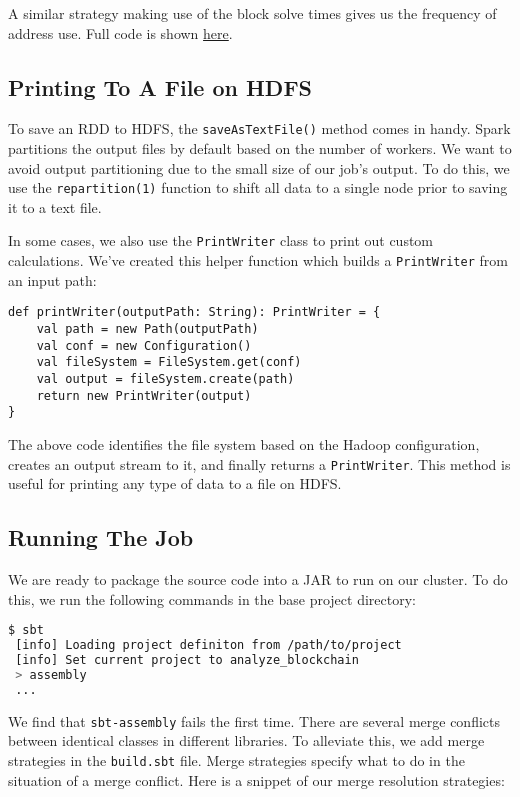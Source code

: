 \documentclass[9pt,twocolumn,twoside]{idsi}
\begin{document}
A similar strategy making use of the block solve times gives us the frequency of address use. Full code is shown \href{https://github.com/nishilshah17/idsi_bitcoin/blob/master/analyze_blockchain/src/main/scala/AddressReuse.scala}{here}.

\subsection{Printing To A File on HDFS}

To save an RDD to HDFS, the \lstinline{saveAsTextFile()} method comes in handy. Spark partitions the output files by default based on the number of workers. We want to avoid output partitioning due to the small size of our job's output. To do this, we use the \lstinline{repartition(1)} function to shift all data to a single node prior to saving it to a text file.

In some cases, we also use the \lstinline{PrintWriter} class to print out custom calculations. We've created this helper function which builds a \lstinline{PrintWriter} from an input path:

\begin{lstlisting}
def printWriter(outputPath: String): PrintWriter = {
    val path = new Path(outputPath)
    val conf = new Configuration()
    val fileSystem = FileSystem.get(conf)
    val output = fileSystem.create(path)
    return new PrintWriter(output)
}
\end{lstlisting}

The above code identifies the file system based on the Hadoop configuration, creates an output stream to it, and finally returns a \lstinline{PrintWriter}. This method is useful for printing any type of data to a file on HDFS.

\subsection{Running The Job}
We are ready to package the source code into a JAR to run on our cluster. To do this, we run the following commands in the base project directory:

\begin{lstlisting}[language=bash]
 $ sbt
 [info] Loading project definiton from /path/to/project
 [info] Set current project to analyze_blockchain
 > assembly
 ...
\end{lstlisting}

We find that \lstinline{sbt-assembly} fails the first time. There are several merge conflicts between identical classes in different libraries. To alleviate this, we add merge strategies in the \lstinline{build.sbt} file. Merge strategies specify what to do in the situation of a merge conflict. Here is a snippet of our merge resolution strategies:
\end{document}

